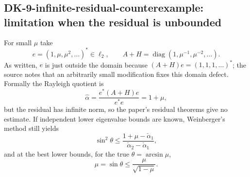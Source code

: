 \subsection*{DK-9-infinite-residual-counterexample: limitation when the residual is unbounded}
For small $\mu$ take
\[
 e=(1,\mu,\mu^2,\ldots)^*\in\ell_2,
 \qquad
 A+H=\operatorname{diag}(1,\mu^{-1},\mu^{-2},\ldots).
\]
As written, $e$ is just outside the domain because $(A+H)e=(1,1,1,\ldots)^*$; the source notes that an arbitrarily small modification fixes this domain defect.  Formally the Rayleigh quotient is
\[
 \widehat\alpha=\frac{e^*(A+H)e}{e^*e}=1+\mu,
\]
but the residual has infinite norm, so the paper's residual theorems give no estimate.  If independent lower eigenvalue bounds are known, Weinberger's method still yields
\[
 \sin^2\theta\le
 \frac{1+\mu-\check\alpha_1}{\check\alpha_2-\check\alpha_1},
\]
and at the best lower bounds, for the true $\theta=\arcsin\mu$,
\[
 \mu=\sin\theta\le\frac{\mu}{\sqrt{1-\mu}}.
\]

